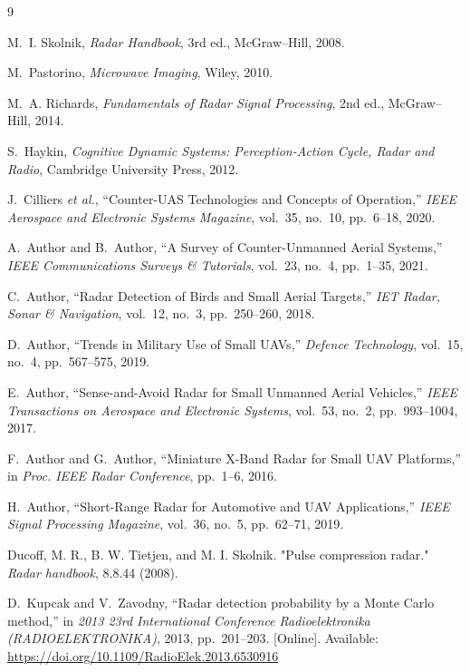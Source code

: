 \begin{thebibliography}{9}

M.~I. Skolnik,
\emph{Radar Handbook}, 3rd ed.,
McGraw--Hill, 2008.

M.~Pastorino,
\emph{Microwave Imaging},
Wiley, 2010.

M.~A. Richards,
\emph{Fundamentals of Radar Signal Processing}, 2nd ed.,
McGraw--Hill, 2014.

S.~Haykin,
\emph{Cognitive Dynamic Systems: Perception-Action Cycle, Radar and Radio},
Cambridge University Press, 2012.

J.~Cilliers \emph{et al.},
``Counter-UAS Technologies and Concepts of Operation,''
\emph{IEEE Aerospace and Electronic Systems Magazine},
vol.~35, no.~10, pp.~6--18, 2020.

A.~Author and B.~Author,
``A Survey of Counter-Unmanned Aerial Systems,''
\emph{IEEE Communications Surveys \& Tutorials},
vol.~23, no.~4, pp.~1--35, 2021.

C.~Author,
``Radar Detection of Birds and Small Aerial Targets,''
\emph{IET Radar, Sonar \& Navigation},
vol.~12, no.~3, pp.~250--260, 2018.

D.~Author,
``Trends in Military Use of Small UAVs,''
\emph{Defence Technology},
vol.~15, no.~4, pp.~567--575, 2019.

E.~Author,
``Sense-and-Avoid Radar for Small Unmanned Aerial Vehicles,''
\emph{IEEE Transactions on Aerospace and Electronic Systems},
vol.~53, no.~2, pp.~993--1004, 2017.

F.~Author and G.~Author,
``Miniature X-Band Radar for Small UAV Platforms,''
in \emph{Proc. IEEE Radar Conference},
pp.~1--6, 2016.

H.~Author,
``Short-Range Radar for Automotive and UAV Applications,''
\emph{IEEE Signal Processing Magazine},
vol.~36, no.~5, pp.~62--71, 2019.



Ducoff, M. R., B. W. Tietjen, and M. I. Skolnik. 
"Pulse compression radar." 
\emph{Radar handbook}, 
8.8.44 (2008).

D.~Kupcak and V.~Zavodny,
``Radar detection probability by a Monte Carlo method,''
in \emph{2013 23rd International Conference Radioelektronika (RADIOELEKTRONIKA)}, 2013, pp.~201--203.
[Online]. Available: \url{https://doi.org/10.1109/RadioElek.2013.6530916}


\end{thebibliography}
